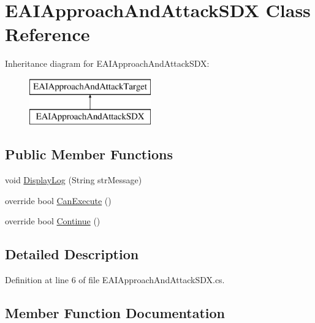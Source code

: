 \hypertarget{class_e_a_i_approach_and_attack_s_d_x}{}\section{E\+A\+I\+Approach\+And\+Attack\+S\+DX Class Reference}
\label{class_e_a_i_approach_and_attack_s_d_x}
Inheritance diagram for E\+A\+I\+Approach\+And\+Attack\+S\+DX\+:\begin{figure}[H]
\begin{center}
\leavevmode
\includegraphics[height=2.000000cm]{da/d93/class_e_a_i_approach_and_attack_s_d_x}
\end{center}
\end{figure}
\subsection*{Public Member Functions}
\begin{DoxyCompactItemize}
\item 
void \mbox{\hyperlink{class_e_a_i_approach_and_attack_s_d_x_a873a0f9cf095c391535442e11cb9fc2c}{Display\+Log}} (String str\+Message)
\item 
override bool \mbox{\hyperlink{class_e_a_i_approach_and_attack_s_d_x_a335ae72728405fa39b43a1a425d19e75}{Can\+Execute}} ()
\item 
override bool \mbox{\hyperlink{class_e_a_i_approach_and_attack_s_d_x_a9f3130a32e9a3b52e6edd4c5d13ab5f2}{Continue}} ()
\end{DoxyCompactItemize}


\subsection{Detailed Description}


Definition at line 6 of file E\+A\+I\+Approach\+And\+Attack\+S\+D\+X.\+cs.



\subsection{Member Function Documentation}
\mbox{\label{class_e_a_i_approach_and_attack_s_d_x_a335ae72728405fa39b43a1a425d19e75}} 
